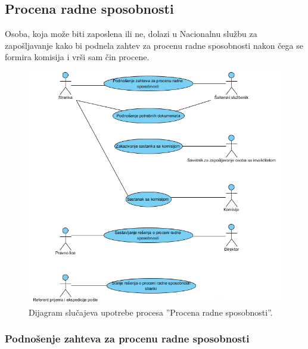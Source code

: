 \subsection{Procena radne sposobnosti}

Osoba, koja mo\v ze biti zaposlena ili ne, dolazi u Nacionalnu slu\v zbu za zapo\v sljavanje kako bi podnela zahtev za procenu radne sposobnosti nakon \v cega se formira komisija i vr\v si sam \v cin procene.

\begin{figure}[H]
	\centering
	\includegraphics[width=\textwidth]{dijagrami/dijagrami-slucajeva-upotrebe/procena-radne-sposobnosti.png}
	\caption{Dijagram slu\v cajeva upotrebe procesa ''Procena radne sposobnosti''.}
	\label{dsu: procena_radne_sposobnosti}
\end{figure}


\subsubsection{Podno\v senje zahteva za procenu radne sposobnosti}

